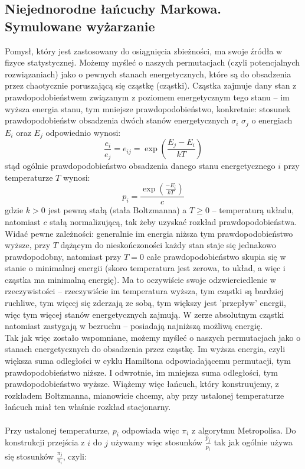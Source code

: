 \documentclass[a4paper]{article}
\theoremstyle{defn}
\theoremstyle{theorem}
\theoremstyle{lemma}
\theoremstyle{cor}
\theoremstyle{fact}
\begin{document}
\subsection{Niejednorodne łańcuchy Markowa. Symulowane wyżarzanie} 
Pomysł, który jest zastosowany do osiągnięcia zbieżności, ma swoje źródła w fizyce statystycznej. Możemy myśleć o naszych permutacjach (czyli potencjalnych rozwiązaniach) jako o pewnych stanach energetycznych, które są do obsadzenia przez chaotycznie poruszającą się cząstkę (cząstki). Cząstka zajmuje dany stan z prawdopodobieństwem związanym z poziomem energetycznym tego stanu – im wyższa energia stanu, tym mniejsze prawdopodobieństwo, konkretnie: stosunek prawdopodobieństw obsadzenia dwóch stanów energetycznych $\sigma_i$ $\sigma_j$ o energiach $E_i$ oraz $E_j$ odpowiednio wynosi:
$$\frac{e_i}{e_j} = e_{ij} = \exp\left(\frac{E_j - E_i}{kT}\right)$$
stąd ogólnie prawdopodobieństwo obsadzenia danego stanu energetycznego $i$ przy temperaturze $T$ wynosi:
$$p_i = \frac{\exp(\frac{-E_i}{kT})}{c}$$
gdzie $k>0$ jest pewną stałą (stała Boltzmanna) a $T\geq0$ – temperaturą układu, natomiast $c$ stałą normalizującą, tak żeby uzyskać rozkład prawdopodobieństwa. Widać pewne zależności: generalnie im energia niższa tym prawdopodobieństwo wyższe, przy $T$ dążącym do nieskończoności każdy stan staje się jednakowo prawdopodobny, natomiast przy $T=0$ całe prawdopodobieństwo skupia się w stanie o minimalnej energii (skoro temperatura jest zerowa, to układ, a więc i cząstka ma minimalną energię). Ma to oczywiście swoje odzwierciedlenie w rzeczywistości – rzeczywiście im temperatura wyższa, tym cząstki są bardziej ruchliwe, tym więcej się zderzają ze sobą, tym większy jest 'przepływ' energii, więc tym więcej stanów energetycznych zajmują. W zerze absolutnym cząstki natomiast zastygają w bezruchu – posiadają najniższą możliwą energię.\\
Tak jak więc zostało wspomniane, możemy myśleć o naszych permutacjach jako o stanach energetycznych do obsadzenia przez cząstkę. Im wyższa energia, czyli większa suma odległości w cyklu Hamiltona odpowiadającemu permutacji, tym prawdopodobieństwo niższe. I odwrotnie, im mniejsza suma odległości, tym prawdopodobieństwo wyższe. Wiążemy więc łańcuch, który konstruujemy, z rozkładem Boltzmanna, mianowicie chcemy, aby przy ustalonej temperaturze łańcuch miał ten właśnie rozkład stacjonarny.\\\\
Przy ustalonej temperaturze, $p_i$ odpowiada więc $\pi_i$ z algorytmu Metropolisa. Do konstrukcji przejścia z $i$ do $j$ używamy więc stosunków $\frac{p_j}{p_i}$ tak jak ogólnie używa się stosunków $\frac{\pi_j}{\pi_i}$, czyli:
\end{document}

